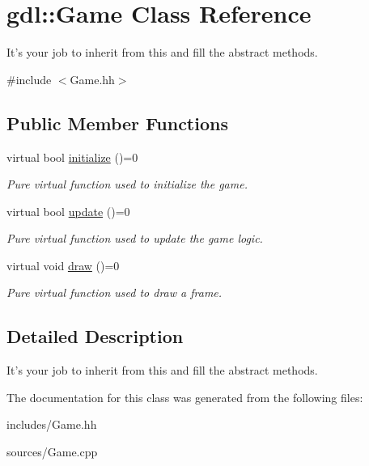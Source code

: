 \hypertarget{classgdl_1_1_game}{\section{gdl\-:\-:Game Class Reference}
\label{classgdl_1_1_game}
}


It's your job to inherit from this and fill the abstract methods.  




{\ttfamily \#include $<$Game.\-hh$>$}

\subsection*{Public Member Functions}
\begin{DoxyCompactItemize}
\item 
\hypertarget{classgdl_1_1_game_aecd7b2ddca26bdea632cd2f7a0dc7b49}{virtual bool \hyperlink{classgdl_1_1_game_aecd7b2ddca26bdea632cd2f7a0dc7b49}{initialize} ()=0}\label{classgdl_1_1_game_aecd7b2ddca26bdea632cd2f7a0dc7b49}

\begin{DoxyCompactList}\small\item\em Pure virtual function used to initialize the game. \end{DoxyCompactList}\item 
\hypertarget{classgdl_1_1_game_a48f421b3d96140732cf028057feca989}{virtual bool \hyperlink{classgdl_1_1_game_a48f421b3d96140732cf028057feca989}{update} ()=0}\label{classgdl_1_1_game_a48f421b3d96140732cf028057feca989}

\begin{DoxyCompactList}\small\item\em Pure virtual function used to update the game logic. \end{DoxyCompactList}\item 
\hypertarget{classgdl_1_1_game_a3de59c743de1fc51cc464f0d47514ffa}{virtual void \hyperlink{classgdl_1_1_game_a3de59c743de1fc51cc464f0d47514ffa}{draw} ()=0}\label{classgdl_1_1_game_a3de59c743de1fc51cc464f0d47514ffa}

\begin{DoxyCompactList}\small\item\em Pure virtual function used to draw a frame. \end{DoxyCompactList}\end{DoxyCompactItemize}


\subsection{Detailed Description}
It's your job to inherit from this and fill the abstract methods. 

The documentation for this class was generated from the following files\-:\begin{DoxyCompactItemize}
\item 
includes/Game.\-hh\item 
sources/Game.\-cpp\end{DoxyCompactItemize}
